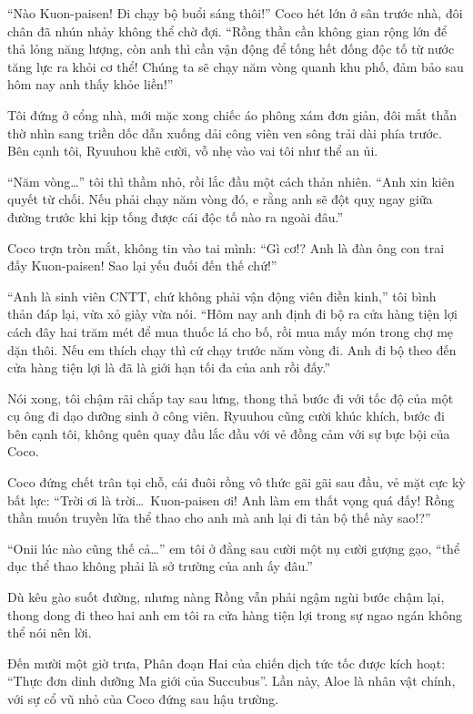\documentclass[../main.tex]{subfiles}
\begin{document}
``Nào Kuon-paisen! Đi chạy bộ buổi sáng thôi!'' Coco hét lớn ở sân trước nhà, đôi chân đã nhún nhảy không thể chờ đợi. ``Rồng thần cần không gian rộng lớn để thả lỏng năng lượng, còn anh thì cần vận động để tống hết đống độc tố từ nước tăng lực ra khỏi cơ thể! Chúng ta sẽ chạy năm vòng quanh khu phố, đảm bảo sau hôm nay anh thấy khỏe liền!''

Tôi đứng ở cổng nhà, mới mặc xong chiếc áo phông xám đơn giản, đôi mắt thẫn thờ nhìn sang triền dốc dẫn xuống dải công viên ven sông trải dài phía trước. Bên cạnh tôi, Ryuuhou khẽ cười, vỗ nhẹ vào vai tôi như thể an ủi.

``Năm vòng\dots'' tôi thì thầm nhỏ, rồi lắc đầu một cách thản nhiên. ``Anh xin kiên quyết từ chối. Nếu phải chạy năm vòng đó, e rằng anh sẽ đột quỵ ngay giữa đường trước khi kịp tống được cái độc tố nào ra ngoài đâu.''

Coco trợn tròn mắt, không tin vào tai mình: ``Gì cơ!? Anh là đàn ông con trai đấy Kuon-paisen! Sao lại yếu đuối đến thế chứ!''

``Anh là sinh viên CNTT, chứ không phải vận động viên điền kinh,'' tôi bình thản đáp lại, vừa xỏ giày vừa nói. ``Hôm nay anh định đi bộ ra cửa hàng tiện lợi cách đây hai trăm mét để mua thuốc lá cho bố, rồi mua mấy món trong chợ mẹ dặn thôi. Nếu em thích chạy thì cứ chạy trước năm vòng đi. Anh đi bộ theo đến cửa hàng tiện lợi là đã là giới hạn tối đa của anh rồi đấy.''

Nói xong, tôi chậm rãi chắp tay sau lưng, thong thả bước đi với tốc độ của một cụ ông đi dạo dưỡng sinh ở công viên. Ryuuhou cũng cười khúc khích, bước đi bên cạnh tôi, không quên quay đầu lắc đầu với vẻ đồng cảm với sự bực bội của Coco.

Coco đứng chết trân tại chỗ, cái đuôi rồng vô thức gãi gãi sau đầu, vẻ mặt cực kỳ bất lực: ``Trời ơi là trời\dots\ Kuon-paisen ơi! Anh làm em thất vọng quá đấy! Rồng thần muốn truyền lửa thể thao cho anh mà anh lại đi tản bộ thế này sao!?''

``Onii lúc nào cũng thế cả\dots'' em tôi ở đằng sau cười một nụ cười gượng gạo, ``thể dục thể thao không phải là sở trường của anh ấy đâu.''

Dù kêu gào suốt đường, nhưng nàng Rồng vẫn phải ngậm ngùi bước chậm lại, thong dong đi theo hai anh em tôi ra cửa hàng tiện lợi trong sự ngao ngán không thể nói nên lời.

\ct

Đến mười một giờ trưa, Phân đoạn Hai của chiến dịch tức tốc được kích hoạt: ``Thực đơn dinh dưỡng Ma giới của Succubus''. Lần này, Aloe là nhân vật chính, với sự cổ vũ nhỏ của Coco đứng sau hậu trường.
\end{document}
